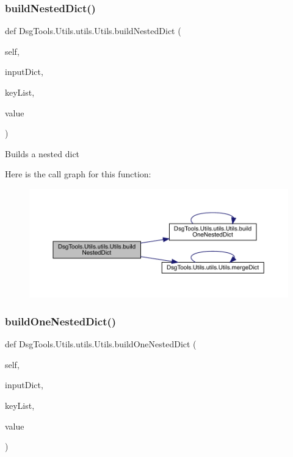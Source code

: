 \subsubsection{\texorpdfstring{build\+Nested\+Dict()}{buildNestedDict()}}
{\footnotesize\ttfamily def Dsg\+Tools.\+Utils.\+utils.\+Utils.\+build\+Nested\+Dict (\begin{DoxyParamCaption}\item[{}]{self,  }\item[{}]{input\+Dict,  }\item[{}]{key\+List,  }\item[{}]{value }\end{DoxyParamCaption})}

\begin{DoxyVerb}Builds a nested dict
\end{DoxyVerb}
 Here is the call graph for this function\+:
\nopagebreak
\begin{figure}[H]
\begin{center}
\leavevmode
\includegraphics[width=350pt]{class_dsg_tools_1_1_utils_1_1utils_1_1_utils_ad03cd0daee48819be7fbb0f1bb30c4d0_cgraph}
\end{center}
\end{figure}
\mbox{\label{class_dsg_tools_1_1_utils_1_1utils_1_1_utils_a02133bd06c1d3fcd6319e7a59256d7e3}} 
\subsubsection{\texorpdfstring{build\+One\+Nested\+Dict()}{buildOneNestedDict()}}
{\footnotesize\ttfamily def Dsg\+Tools.\+Utils.\+utils.\+Utils.\+build\+One\+Nested\+Dict (\begin{DoxyParamCaption}\item[{}]{self,  }\item[{}]{input\+Dict,  }\item[{}]{key\+List,  }\item[{}]{value }\end{DoxyParamCaption})}


